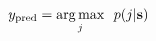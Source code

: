 \begin{equation}
    y_{\rm pred} = \underset{j}{\rm arg\,max} ~~ p(j|\mathbf{s})
    \label{eq:prediction}
\end{equation}
